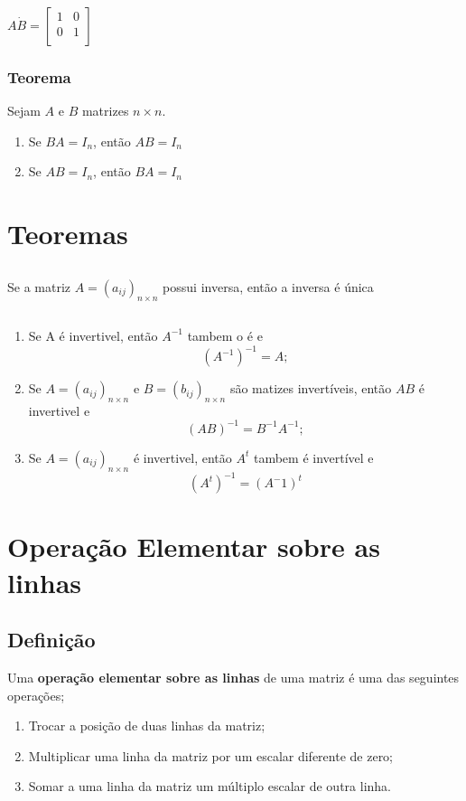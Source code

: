 \documentclass{article}
\begin{document}
$A \dot B = 
\begin{bmatrix}
  1 & 0 \\
  0 & 1 \\
\end{bmatrix}$

\subsubsection{Teorema}
Sejam $A$ e $B$ matrizes $n \times n$.
\begin{enumerate}[label=(\alph*)]
  \item Se $BA = I_n$, então $AB = I_n$
  \item Se $AB = I_n$, então $BA = I_n$ 
\end{enumerate}

\section{Teoremas}
\subsection{}
Se a matriz $A = (a_{ij})_{n \times n}$ possui inversa, então a inversa é única
\subsection{}
\begin{enumerate}[label=(\alph*)]
  \item Se A é invertivel, então $A^{-1}$ tambem o é e 
  $$(A^{-1})^{-1} = A;$$
  \item Se $A = (a_{ij})_{n \times n}$ e $B = (b_{ij})_{n \times n}$ são matizes invertíveis, então $AB$ é invertivel e 
  $$(AB)^{-1} = B^{-1}A^{-1};$$
  \item Se $A = (a_{ij})_{n \times n}$ é invertivel, então $A^t$ tambem é invertível e 
  $$(A^t)^{-1} = (A^-1)^t$$ 
\end{enumerate}

\section{Operação Elementar sobre as linhas}
\subsection{Definição}
Uma \textbf{operação elementar sobre as linhas} de uma matriz é uma das seguintes operações;
\begin{enumerate}[label=(\alph*)]
  \item Trocar a posição de duas linhas da matriz;
  \item Multiplicar uma linha da matriz por um escalar diferente de zero;
  \item Somar a uma linha da matriz um múltiplo escalar de outra linha.
\end{enumerate} 
\end{document}
